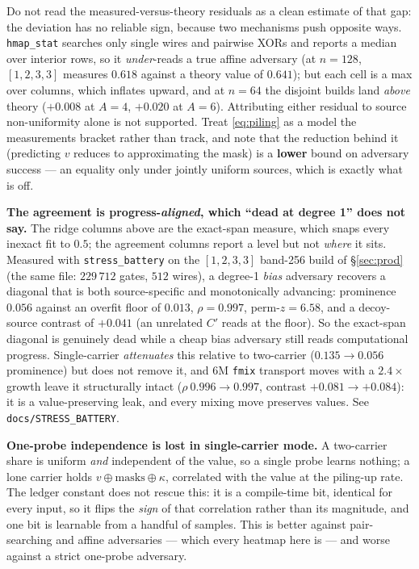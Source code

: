 \documentclass[11pt]{article}
\newcommand{\xor}{\oplus}
\newcommand{\code}[1]{\texttt{#1}}
\begin{document}
Do not read the measured-versus-theory residuals as a clean estimate of that
gap: the deviation has no reliable sign, because two mechanisms push opposite
ways. \code{hmap\_stat} searches only single wires and pairwise XORs and reports
a median over interior rows, so it \emph{under}-reads a true affine adversary
(at $n{=}128$, $[1,2,3,3]$ measures $0.618$ against a theory value of $0.641$);
but each cell is a max over columns, which inflates upward, and at $n{=}64$ the
disjoint builds land \emph{above} theory ($+0.008$ at $A{=}4$, $+0.020$ at
$A{=}6$). Attributing either residual to source non-uniformity alone is not
supported. Treat \eqref{eq:piling} as a model the measurements bracket rather
than track, and note that the reduction behind it (predicting $v$ reduces to
approximating the mask) is a \textbf{lower} bound on adversary success --- an
equality only under jointly uniform sources, which is exactly what is off.

\textbf{The agreement is progress-\emph{aligned}, which ``dead at degree 1'' does
not say.} The ridge columns above are the exact-span measure, which snaps every
inexact fit to $0.5$; the agreement columns report a level but not \emph{where}
it sits. Measured with \code{stress\_battery} on the $[1,2,3,3]$ band-256 build
of \S\ref{sec:prod} (the same file: $229\,712$ gates, $512$ wires), a degree-1
\emph{bias} adversary recovers a diagonal that is both source-specific and
monotonically advancing: prominence $0.056$ against an overfit floor of $0.013$,
$\rho = 0.997$, perm-$z = 6.58$, and a decoy-source contrast of $+0.041$ (an
unrelated $C'$ reads at the floor). So the exact-span diagonal is genuinely dead
while a cheap bias adversary still reads computational progress. Single-carrier
\emph{attenuates} this relative to two-carrier ($0.135 \to 0.056$ prominence) but
does not remove it, and $6$M \code{fmix} transport moves with a $2.4\times$ growth
leave it structurally intact ($\rho\ 0.996 \to 0.997$, contrast $+0.081 \to
+0.084$): it is a value-preserving leak, and every mixing move preserves values.
See \code{docs/STRESS\_BATTERY}.

\textbf{One-probe independence is lost in single-carrier mode.} A two-carrier
share is uniform \emph{and} independent of the value, so a single probe learns
nothing; a lone carrier holds $v \xor \text{masks} \xor \kappa$, correlated with
the value at the piling-up rate. The ledger constant does not rescue this: it is
a compile-time bit, identical for every input, so it flips the \emph{sign} of
that correlation rather than its magnitude, and one bit is learnable from a
handful of samples. This is better against pair-searching and affine
adversaries --- which every heatmap here is --- and worse against a strict
one-probe adversary.
\end{document}
